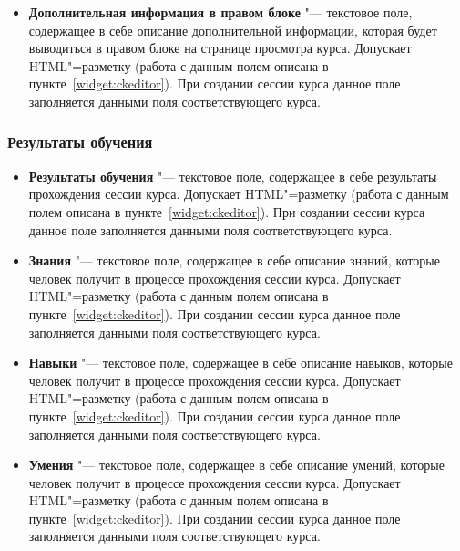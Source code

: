 \begin{itemize}
		\item \textbf{Дополнительная информация в правом блоке} "--- текстовое поле, содержащее в себе описание дополнительной информации, которая будет выводиться в правом блоке на странице просмотра курса. Допускает HTML"=разметку (работа с данным полем описана в пункте~\ref{widget:ckeditor}). При создании сессии курса данное поле заполняется данными поля  соответствующего курса.
	\end{itemize}

\subsubsection{Результаты обучения}
	\begin{itemize}
		\item \textbf{Результаты обучения} "--- текстовое поле, содержащее в себе результаты прохождения сессии курса. Допускает HTML"=разметку (работа с данным полем описана в пункте~\ref{widget:ckeditor}). При создании сессии курса данное поле заполняется данными поля  соответствующего курса.
		
		\item \textbf{Знания} "--- текстовое поле, содержащее в себе описание знаний, которые человек получит в процессе прохождения сессии курса. Допускает HTML"=разметку (работа с данным полем описана в пункте~\ref{widget:ckeditor}). При создании сессии курса данное поле заполняется данными поля  соответствующего курса.
		
		\item \textbf{Навыки} "--- текстовое поле, содержащее в себе описание навыков, которые человек получит в процессе прохождения сессии курса. Допускает HTML"=разметку (работа с данным полем описана в пункте~\ref{widget:ckeditor}). При создании сессии курса данное поле заполняется данными поля  соответствующего курса.
		
		\item \textbf{Умения} "--- текстовое поле, содержащее в себе описание умений, которые человек получит в процессе прохождения сессии курса. Допускает HTML"=разметку (работа с данным полем описана в пункте~\ref{widget:ckeditor}). При создании сессии курса данное поле заполняется данными поля  соответствующего курса.
	\end{itemize}

